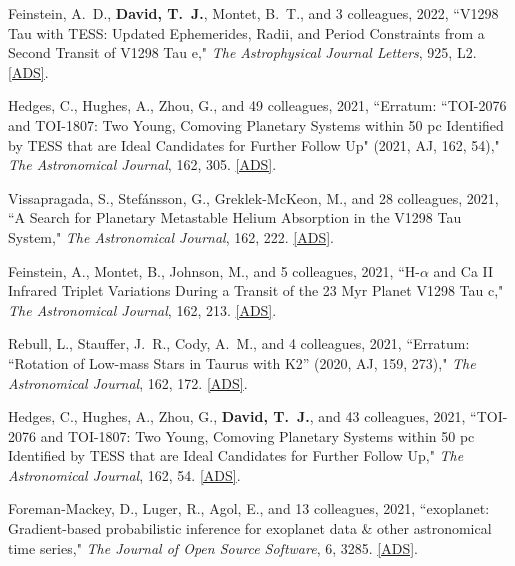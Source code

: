 \item {{Feinstein}, A.~D., \textbf{{David}, T.~J.}, {Montet}, B.~T., and 3 colleagues}, 2022, ``{V1298 Tau with TESS: Updated Ephemerides, Radii, and Period Constraints from a Second Transit of V1298 Tau e}," \textit{The Astrophysical Journal Letters}, 925, L2. \href{https://ui.adsabs.harvard.edu/abs/2022ApJ...925L...2F/abstract}{[ADS]}.

\item {{Hedges}, C., {Hughes}, A., {Zhou}, G., and 49 colleagues}, 2021, ``{Erratum: ``TOI-2076 and TOI-1807: Two Young, Comoving Planetary Systems within 50 pc Identified by TESS that are Ideal Candidates for Further Follow Up" (2021, AJ, 162, 54)}," \textit{The Astronomical Journal}, 162, 305. \href{https://ui.adsabs.harvard.edu/abs/2021AJ....162..305H/abstract}{[ADS]}.

\item {{Vissapragada}, S., {Stef{\'a}nsson}, G., {Greklek-McKeon}, M., and 28 colleagues}, 2021, ``{A Search for Planetary Metastable Helium Absorption in the V1298 Tau System}," \textit{The Astronomical Journal}, 162, 222. 
\href{https://ui.adsabs.harvard.edu/abs/2021AJ....162..222V/abstract}{[ADS]}.

\item {{Feinstein}, A., {Montet}, B., {Johnson}, M., and 5 colleagues}, 2021, ``{H-$\alpha$ and Ca II Infrared Triplet Variations During a Transit of the 23 Myr Planet V1298 Tau c}," \textit{The Astronomical Journal}, 162, 213. \href{https://ui.adsabs.harvard.edu/abs/2021AJ....162..213F/abstract}{[ADS]}.

\item {{Rebull}, L., {Stauffer}, J.~R., {Cody}, A.~M., and 4 colleagues}, 2021, ``{Erratum: ``Rotation of Low-mass Stars in Taurus with K2'' (2020, AJ, 159, 273)}," \textit{The Astronomical Journal}, 162, 172. \href{https://ui.adsabs.harvard.edu/abs/2021AJ....162..172R/abstract}{[ADS]}.

\item {{Hedges}, C., {Hughes}, A., {Zhou}, G., {\bf {David}, T.~J.}, and 43 colleagues}, 2021, ``{TOI-2076 and TOI-1807: Two Young, Comoving Planetary Systems within 50 pc Identified by TESS that are Ideal Candidates for Further Follow Up}," \textit{The Astronomical Journal}, 162, 54. \href{https://ui.adsabs.harvard.edu/abs/2021AJ....162...54H}{[ADS]}.

\item {{Foreman-Mackey}, D., {Luger}, R., {Agol}, E., and 13 colleagues}, 2021, ``{exoplanet: Gradient-based probabilistic inference for exoplanet data \& other astronomical time series}," \textit{The Journal of Open Source Software}, 6, 3285. \href{https://ui.adsabs.harvard.edu/abs/2021JOSS....6.3285F}{[ADS]}.

